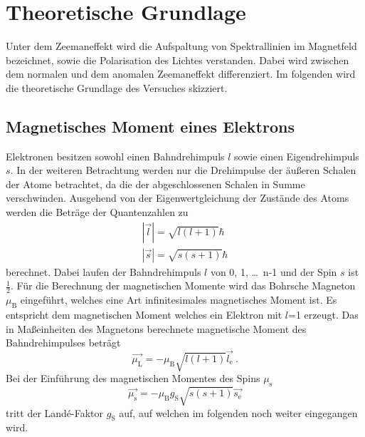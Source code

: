\section{Theoretische Grundlage}
\label{sec:Theorie}
Unter dem Zeemaneffekt wird die Aufspaltung von Spektrallinien im Magnetfeld bezeichnet, sowie die Polarisation des Lichtes verstanden. Dabei wird zwischen dem normalen und dem anomalen Zeemaneffekt differenziert. Im folgenden wird die theoretische Grundlage des Versuches skizziert.

\subsection{Magnetisches Moment eines Elektrons}
Elektronen besitzen sowohl einen Bahndrehimpuls $l$ sowie einen Eigendrehimpuls $s$. In der weiteren Betrachtung werden nur die Drehimpulse der äußeren Schalen der Atome betrachtet, da die der abgeschlossenen Schalen in Summe verschwinden. Ausgehend von der Eigenwertgleichung der Zustände des Atoms werden die Beträge der Quantenzahlen zu
\begin{eqnarray}
  |\vec{l}| = \sqrt{l(l+1)} \hbar  \\
  |\vec{s}| = \sqrt{s(s+1)} \hbar
  \label{eqn:betQua}
\end{eqnarray}
berechnet. Dabei laufen der Bahndrehimpuls $l$ von 0, 1, \ldots $\,$ n-1 und der Spin $s$ ist $\frac{1}{2}$. Für die Berechnung der magnetischen Momente wird das Bohrsche Magneton $\mu_\text{B}$ eingeführt, welches eine Art infinitesimales magnetisches Moment ist. Es entspricht dem magnetischen Moment welches ein Elektron mit $l$=1 erzeugt. Das in Maßeinheiten des Magnetons berechnete magnetische Moment des Bahndrehimpulses beträgt
\begin{equation}
  \vec{\mu_\text{L}} = -\mu_\text{B} \sqrt{l(l+1)} \vec{l_\text{e}} \ .
  \label{eqn:magL}
\end{equation}
Bei der Einführung des magnetischen Momentes des Spins $\mu_\text{s}$
\begin{equation}
  \vec{\mu_\text{s}} = - \mu_\text{B} g_\text{S} \sqrt{s(s+1)} \vec{s_\text{e}}
  \label{eqn:magS}
\end{equation}
tritt der Landé-Faktor $g_\text{S}$ auf, auf welchen im folgenden noch weiter eingegangen wird.

